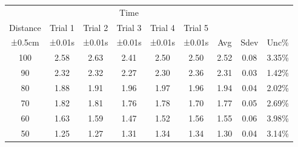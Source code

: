 \documentclass[12pt]{report}
\begin{document}
\begin{table}[]
    \begin{tabular}{ccccccccc}
        \cellcolor[HTML]{6D9EEB}                           & \multicolumn{5}{c}{\cellcolor[HTML]{93C47D}Time} &         &         &                                                                                                                                 \\
        \multirow{-2}{*}{\cellcolor[HTML]{6D9EEB}Distance} & Trial 1                                          & Trial 2 & Trial 3 & Trial 4 & Trial 5 &                           &                                      &                                          \\
        ±0.5cm                                             & ±0.01s                                           & ±0.01s  & ±0.01s  & ±0.01s  & ±0.01s  & \multirow{-3}{*}{Avg} & \multirow{-3}{*}{Sdev} & \multirow{-3}{*}{Unc\%} \\
        100                                                & 2.58                                             & 2.63    & 2.41    & 2.50    & 2.50    & 2.52                      & 0.08                                 & 3.35\%                                   \\
        90                                                 & 2.32                                             & 2.32    & 2.27    & 2.30    & 2.36    & 2.31                      & 0.03                                 & 1.42\%                                   \\
        80                                                 & 1.88                                             & 1.91    & 1.96    & 1.97    & 1.96    & 1.94                      & 0.04                                 & 2.02\%                                   \\
        70                                                 & 1.82                                             & 1.81    & 1.76    & 1.78    & 1.70    & 1.77                      & 0.05                                 & 2.69\%                                   \\
        60                                                 & 1.63                                             & 1.59    & 1.47    & 1.52    & 1.56    & 1.55                      & 0.06                                 & 3.98\%                                   \\
        50                                                 & 1.25                                             & 1.27    & 1.31    & 1.34    & 1.34    & 1.30                      & 0.04                                 & 3.14\%                                   \\

\end{tabular}
\end{table}
\end{document}
